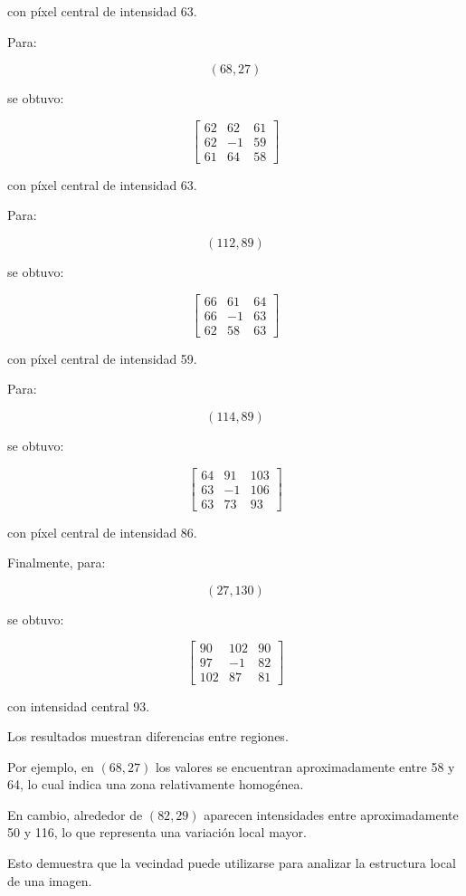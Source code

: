 \documentclass[11pt,letterpaper]{article}
\begin{document}
con píxel central de intensidad 63.

Para:

\[
(68,27)
\]

se obtuvo:

\[
\begin{bmatrix}
62 & 62 & 61\\
62 & -1 & 59\\
61 & 64 & 58
\end{bmatrix}
\]

con píxel central de intensidad 63.

Para:

\[
(112,89)
\]

se obtuvo:

\[
\begin{bmatrix}
66 & 61 & 64\\
66 & -1 & 63\\
62 & 58 & 63
\end{bmatrix}
\]

con píxel central de intensidad 59.

Para:

\[
(114,89)
\]

se obtuvo:

\[
\begin{bmatrix}
64 & 91 & 103\\
63 & -1 & 106\\
63 & 73 & 93
\end{bmatrix}
\]

con píxel central de intensidad 86.

Finalmente, para:

\[
(27,130)
\]

se obtuvo:

\[
\begin{bmatrix}
90 & 102 & 90\\
97 & -1 & 82\\
102 & 87 & 81
\end{bmatrix}
\]

con intensidad central 93.

Los resultados muestran diferencias entre regiones.

Por ejemplo, en $(68,27)$ los valores se encuentran aproximadamente entre 58 y 64, lo cual indica una zona relativamente homogénea.

En cambio, alrededor de $(82,29)$ aparecen intensidades entre aproximadamente 50 y 116, lo que representa una variación local mayor.

Esto demuestra que la vecindad puede utilizarse para analizar la estructura local de una imagen.
\end{document}
